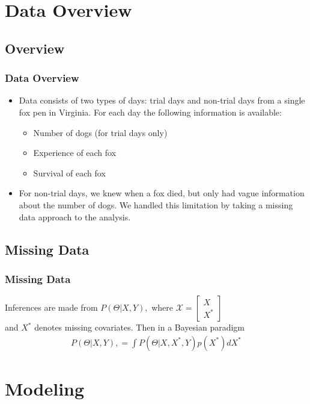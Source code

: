 \documentclass{beamer}
\begin{document}
\section{Data Overview}
\subsection{Overview}
\begin{frame}
	\frametitle{Data Overview}
		\begin{itemize}
			\item Data consists of two types of days: trial days and non-trial days from a single fox pen in Virginia. For each day the following information is available:
			\begin{itemize}
				\item Number of dogs (for trial days only)
				\item Experience of each fox 
				\item Survival of each fox
			\end{itemize}
			\item For non-trial days, we knew when a fox died, but only had vague information about the number of dogs. We handled this limitation by taking a missing data approach to the analysis.
		\end{itemize}
	\end{frame}
\subsection{Missing Data}
\begin{frame}
	\frametitle{Missing Data}
	Inferences are made from $P(\Theta|X,Y),$ where $
    \mathcal{X}=\left[
                \begin{array}{ll}
                  X \\
                  X^{*} 
                \end{array}
              \right]$ \\and $X^{*}$ denotes missing covariates. Then in a Bayesian paradigm
              \begin{eqnarray*}
              P(\Theta|X,Y), = \int P(\Theta|X,X^{*},Y) p(X^{*}) dX^{*}
              \end{eqnarray*}
	\end{frame}
\section{Modeling}
\end{document}
